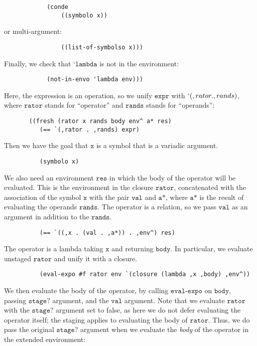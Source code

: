 \documentclass[11pt]{article}
\theoremstyle{definition}
\newcommand{\code}[1]{\texttt{#1}}
\newcommand\tab[1][1cm]{\hspace*{#1}}
\begin{document}
\begin{lstlisting}
            (conde
                ((symbolo x))
\end{lstlisting}
or multi-argument:
\begin{lstlisting}
                ((list-of-symbolso x)))
\end{lstlisting}
\tab Finally, we check that $\code{`lambda}$ is not in the environment:
\begin{lstlisting}
            (not-in-envo 'lambda env)))
\end{lstlisting}
\tab Here, the expression is an operation, so we unify $\code{expr}$ with $`(,rator . ,rands)$, where $\code{rator}$ stands for ``operator'' and $\code{rands}$ stands for ``operands'':
\begin{lstlisting}
       ((fresh (rator x rands body env^ a* res)
          (== `(,rator . ,rands) expr)
\end{lstlisting}
\tab Then we have the goal that $\code{x}$ is a symbol that is a variadic argument.
\begin{lstlisting}
          (symbolo x)
\end{lstlisting}
\tab We also need an environment $\code{res}$ in which the body of the operator will be evaluated. This is the environment in the closure $\code{rator}$, concatenated with the association of the symbol $\code{x}$ with the pair $\code{val}$ and $\code{a*}$, where $\code{a*}$ is the result of evaluating the operands $\code{rands}$. The operator is a relation, so we pass $\code{val}$ as an argument in addition to the $\code{rands}$. 
\begin{lstlisting}
          (== `((,x . (val . ,a*)) . ,env^) res)
\end{lstlisting}
\tab The operator is a lambda taking $\code{x}$ and returning $\code{body}$. In particular, we evaluate unstaged $\code{rator}$ and unify it with a closure.
\begin{lstlisting}
          (eval-expo #f rator env `(closure (lambda ,x ,body) ,env^))
\end{lstlisting}
\tab We then evaluate the body of the operator, by calling $\code{eval-expo}$ on $\code{body}$, passing $\code{stage?}$ argument, and the $\code{val}$ argument. Note that we evaluate $\code{rator}$ with the $\code{stage?}$ argument set to false, as here we do not defer evaluating the operator itself; the staging applies to evaluating the body of $\code{rator}$. Thus, we do pass the original $\code{stage?}$ argument when we evaluate the \textit{body} of the operator in the extended environment:
\end{document}
